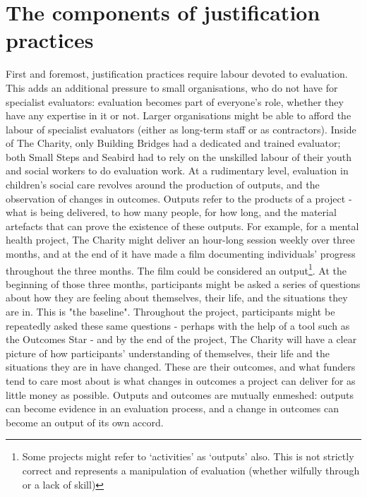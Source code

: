 \section{The components of justification practices}
\label{sec:6-3-components}
First and foremost, justification practices require labour devoted to evaluation. This adds an additional pressure to small organisations, who do not have for specialist evaluators: evaluation becomes part of everyone's role, whether they have any expertise in it or not. Larger organisations might be able to afford the labour of specialist evaluators (either as long-term staff or as contractors). Inside of The Charity, only Building Bridges had a dedicated and trained evaluator; both Small Steps and Seabird had to rely on the unskilled labour of their youth and social workers to do evaluation work. At a rudimentary level, evaluation in children's social care revolves around the production of outputs, and the observation of changes in outcomes. Outputs refer to the products of a project - what is being delivered, to how many people, for how long, and the material artefacts that can prove the existence of these outputs. For example, for a mental health project,  The Charity might deliver an hour-long session weekly over three months, and at the end of it have made a film documenting individuals' progress throughout the three months. The film could be considered an output\footnote{Some projects might refer to `activities' as `outputs' also. This is not strictly correct and represents a manipulation of evaluation (whether wilfully through or a lack of skill)}. At the beginning of those three months,  participants might be asked a series of questions about how they are feeling about themselves, their life, and the situations they are in. This is "the baseline". Throughout the project,  participants might be repeatedly asked these same questions - perhaps with the help of a tool such as the Outcomes Star - and by the end of the project, The Charity will have a clear picture of how participants' understanding of themselves, their life and the situations they are in have changed. These are their outcomes, and what funders tend to care most about is what changes in outcomes a project can deliver for as little money as possible. Outputs and outcomes are mutually enmeshed: outputs can become evidence in an evaluation process, and a change in outcomes can become an output of its own accord.

